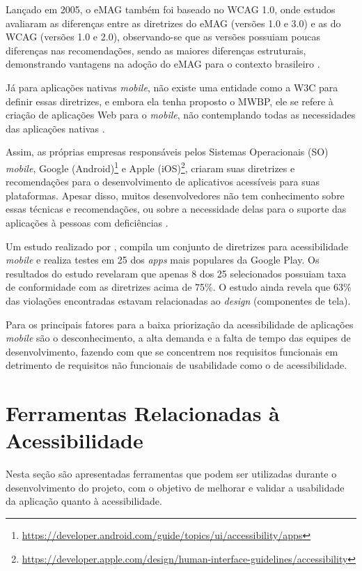Lançado em 2005, o eMAG também foi baseado no WCAG 1.0, onde estudos avaliaram as diferenças entre as diretrizes do eMAG
(versões 1.0 e 3.0) e as do WCAG (versões 1.0 e 2.0), observando-se que as versões possuiam poucas
diferenças nas recomendações, sendo as maiores diferenças estruturais, demonstrando vantagens na adoção do eMAG para o
contexto brasileiro \cite{Bach_2009,Rocha_2013}.

Já para aplicações nativas \textit{mobile}, não existe uma entidade como a W3C para definir essas diretrizes, e embora
ela tenha proposto o MWBP, ele se refere à criação de aplicações Web para o \emph{mobile}, não contemplando todas
as necessidades das aplicações nativas \cite{W3C_2008}.

Assim, as próprias empresas responsáveis pelos Sistemas Operacionais (SO) \emph{mobile}, Google (Android)\footnote{\url{https://developer.android.com/guide/topics/ui/accessibility/apps}}
e Apple (iOS)\footnote{\url{https://developer.apple.com/design/human-interface-guidelines/accessibility}},
criaram suas diretrizes e recomendações para o desenvolvimento de aplicativos acessíveis para suas plataformas.
Apesar disso, muitos desenvolvedores não tem conhecimento sobre essas técnicas e recomendações, ou sobre a necessidade delas
para o suporte das aplicações à pessoas com deficiências \cite{Quispe2020,Bi2021}.

Um estudo realizado por , compila um conjunto de diretrizes para acessibilidade \textit{mobile} e realiza
testes em 25 dos \textit{apps} mais populares da Google Play. Os resultados do estudo revelaram que apenas 8 dos 25 selecionados
possuiam taxa de conformidade com as diretrizes acima de 75\%. O estudo ainda revela que 63\% das violações encontradas estavam
relacionadas ao \textit{design} (componentes de tela).

Para  os principais fatores para a baixa priorização da acessibilidade de aplicações \textit{mobile}
são o desconhecimento, a alta demanda e a falta de tempo das equipes de desenvolvimento, fazendo com que se concentrem nos
requisitos funcionais em detrimento de requisitos não funcionais de usabilidade como o de acessibilidade.

\section{Ferramentas Relacionadas à Acessibilidade}
Nesta seção são apresentadas ferramentas que podem ser utilizadas durante o desenvolvimento do projeto, com o objetivo de melhorar e validar a usabilidade
da aplicação quanto à acessibilidade.

